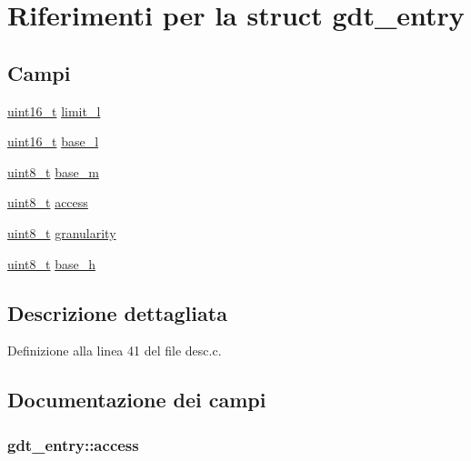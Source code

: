 \hypertarget{structgdt__entry}{\section{Riferimenti per la struct gdt\+\_\+entry}
\label{structgdt__entry}
}
\subsection*{Campi}
\begin{DoxyCompactItemize}
\item 
\hyperlink{aplus_8h_a5a8b2dc9e45a9ee81a94ef304fb62505}{uint16\+\_\+t} \hyperlink{structgdt__entry_aac421dd71cee241d3c91179d679e477c}{limit\+\_\+l}
\item 
\hyperlink{aplus_8h_a5a8b2dc9e45a9ee81a94ef304fb62505}{uint16\+\_\+t} \hyperlink{structgdt__entry_ae9d195807cdaf9fdfa4d28522b4e6ea6}{base\+\_\+l}
\item 
\hyperlink{aplus_8h_ae0430369c5a35dcdbc0bc19dcbb33a03}{uint8\+\_\+t} \hyperlink{structgdt__entry_a9866fb96bce8b51042b75995a9f5ed4f}{base\+\_\+m}
\item 
\hyperlink{aplus_8h_ae0430369c5a35dcdbc0bc19dcbb33a03}{uint8\+\_\+t} \hyperlink{structgdt__entry_af8f88469b3301c3e777e97b470a97413}{access}
\item 
\hyperlink{aplus_8h_ae0430369c5a35dcdbc0bc19dcbb33a03}{uint8\+\_\+t} \hyperlink{structgdt__entry_accb2a2ef318b0e4fbe2016eb8097947d}{granularity}
\item 
\hyperlink{aplus_8h_ae0430369c5a35dcdbc0bc19dcbb33a03}{uint8\+\_\+t} \hyperlink{structgdt__entry_af64e5321b471da1d5ddf85ff9b0a19d3}{base\+\_\+h}
\end{DoxyCompactItemize}


\subsection{Descrizione dettagliata}


Definizione alla linea 41 del file desc.\+c.



\subsection{Documentazione dei campi}
\hypertarget{structgdt__entry_af8f88469b3301c3e777e97b470a97413}{
\subsubsection[{access}]{ gdt\+\_\+entry\+::access}}\label{structgdt__entry_af8f88469b3301c3e777e97b470a97413}


